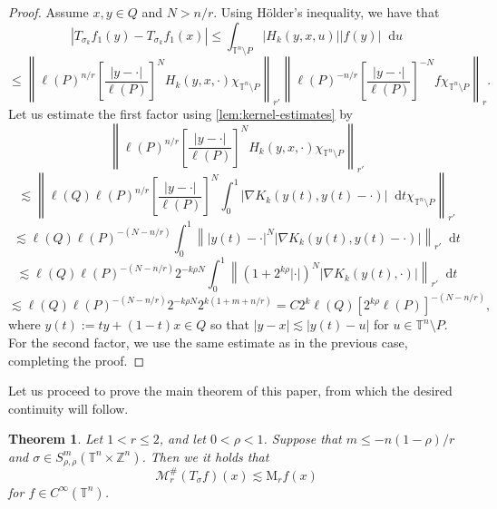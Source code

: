 \documentclass[12pt, reqno]{amsart}
\newtheorem{theorem}{Theorem}[section]
\theoremstyle{definition}
\theoremstyle{remark}
\numberwithin{equation}{section}
\newcommand*\diff{\mathop{}\!\mathrm{d}}
\begin{document}
\begin{proof}
    Assume $x, y \in Q$ and $N>n/r$. Using H\"older's inequality, we have that
    \begin{equation*}
        |T_{\sigma_k}f_1(y) - T_{\sigma_k}f_1(x)| \leq \int_{\mathbb{T}^n\setminus P} |H_k(y, x, u)||f(y)|\diff u
    \end{equation*}
    \begin{equation*}
        \leq \left\| \ell(P)^{n/r} \left[ \frac{|y-\cdot|}{\ell(P)}
        \right]^N H_k(y, x, \cdot) \chi_{\mathbb{T}^n\setminus P}
        \right\|_{r'} \left\| \ell(P)^{-n/r} \left[ \frac{|y-\cdot|}{\ell(P)}
        \right]^{-N} f\chi_{\mathbb{T}^n\setminus P}
        \right\|_r.
    \end{equation*}
    Let us estimate the first factor using \cref{lem:kernel-estimates} by
    \begin{equation*}
        \left\| \ell(P)^{n/r} \left[ \frac{|y-\cdot|}{\ell(P)}
        \right]^N H_k(y, x, \cdot) \chi_{\mathbb{T}^n\setminus P}
        \right\|_{r'}
    \end{equation*}
    \begin{equation*}
        \lesssim \left\| \ell(Q)\ell(P)^{n/r} \left[ \frac{|y-\cdot|}{\ell(P)}
        \right]^N \int_0^1|\nabla K_k(y(t), y(t) - \cdot)|\diff t \chi_{\mathbb{T}^n\setminus P}
        \right\|_{r'}
    \end{equation*}
    \begin{equation*}
        \lesssim \ell(Q)\ell(P)^{-(N-n/r)} \int_0^1\left\| |y(t) - \cdot|^N |\nabla K_k(y(t), y(t) - \cdot)|
        \right\|_{r'} \diff t
    \end{equation*}
    \begin{equation*}
        \lesssim \ell(Q)\ell(P)^{-(N-n/r)} 2^{-k\rho N} \int_0^1 \left\| (1+2^{k\rho}|\cdot|)^N |\nabla K_k(y(t), \cdot)| 
        \right\|_{r'} \diff t
    \end{equation*}
    \begin{equation*}
        \lesssim \ell(Q)\ell(P)^{-(N-n/r)} 2^{-k\rho N} 2^{k(1+m+n/r)} = C 2^k \ell(Q)[2^{k\rho}\ell(P)]^{-(N-n/r)},
    \end{equation*}
    where $y(t) := ty + (1-t)x \in Q$ so that $|y-x|\lesssim|y(t)-u|$ for $u \in \mathbb{T}^n\setminus P$. For the second factor, we use the same estimate as in the previous case, completing the proof.
\end{proof}
Let us proceed to prove the main theorem of this paper, from which the desired continuity will follow.
\begin{theorem}
    Let $1<r\leq 2$, and let $0<\rho<1$. Suppose that $m\leq-n(1-\rho)/r$ and $\sigma \in S^m_{\rho,\rho}(\mathbb{T}^n \times \mathbb{Z}^n)  $. Then we it holds that 
    \begin{equation*}
        \mathcal{M}^\#_r(T_\sigma f)(x) \lesssim\mathrm{M}_r f(x)
    \end{equation*}
    for $f \in C^\infty(\mathbb{T}^n)$.
    \label{theo:sharp-maximal}
\end{theorem}
\end{document}
